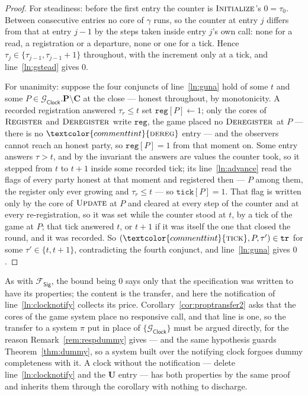\documentclass[10pt,oneside,openany]{book}
\newcommand{\Ps}{\mathbf{P}}
\newcommand{\uses}{\mathbf{U}}
\newcommand{\Cs}{\mathbf{C}}
\newcommand{\op}[1]{\textnormal{\textsc{#1}}}
\newcommand{\atom}[1]{\textcolor{commenttint}{\op{#1}}}
\newcommand{\Fsig}{\mathcal{F}_{\mathsf{Sig}}}
\newcommand{\Gclock}{\mathcal{G}_{\mathsf{Clock}}}
\newcommand{\V}[1]{\mathtt{#1}}
\theoremstyle{accentdef}
\theoremstyle{accentplain}
\begin{document}
\begin{proof}
For steadiness: before the first entry the counter is $\op{Initialize}$'s $0 = \tau_0$. Between
consecutive entries no core of $\gamma$ runs, so the counter at entry $j$ differs from that at
entry $j-1$ by the steps taken inside entry $j$'s own call: none for a read, a registration or a
departure, none or one for a tick. Hence $\tau_j \in \{\tau_{j-1}, \tau_{j-1}+1\}$ throughout,
with the increment only at a tick, and line~\ref{ln:gstead} gives $0$.

For unanimity: suppose the four conjuncts of line~\ref{ln:guna} hold of some $t$ and some
$P \in \Gclock.\Ps \setminus \Cs$ at the close --- honest throughout, by monotonicity. A recorded
registration answered $\tau_r \leq t$ set $\V{reg}[P] \gets 1$; only the cores of $\op{Register}$
and $\op{Deregister}$ write $\V{reg}$, the game placed no $\op{Deregister}$ at $P$ --- there is
no $\atom{dereg}$ entry --- and the observers cannot reach an honest party, so $\V{reg}[P] = 1$
from that moment on. Some entry answers $\tau > t$, and by the invariant the answers are values
the counter took, so it stepped from $t$ to $t+1$ inside some recorded tick; its
line~\ref{ln:advance} read the flags of every party honest at that moment and registered then ---
$P$ among them, the register only ever growing and $\tau_r \leq t$ --- so $\V{tick}[P] = 1$. That
flag is written only by the core of $\op{Update}$ at $P$ and cleared at every step of the counter
and at every re-registration, so it was set while the counter stood at $t$, by a tick of the game
at $P$; that tick answered $t$, or $t+1$ if it was itself the one that closed the round, and it
was recorded. So $(\atom{tick},P,\tau') \in \V{tr}$ for some $\tau' \in \{t,t+1\}$, contradicting
the fourth conjunct, and line~\ref{ln:guna} gives $0$.
\end{proof}

As with $\Fsig$, the bound being $0$ says only that the specification was written to have its
properties; the content is the transfer, and here the notification of line~\ref{ln:clocknotify}
collects its price. Corollary~\ref{cor:proptransfer2} asks that the cores of the game system
place no responsive call, and that line is one, so the transfer to a system $\pi$ put in place of
$\{\Gclock\}$ must be argued directly, for the reason Remark~\ref{rem:respdummy} gives --- and
the same hypothesis guards Theorem~\ref{thm:dummy}, so a system built over the notifying clock
forgoes dummy completeness with it. A clock without the notification --- delete
line~\ref{ln:clocknotify} and the $\uses$ entry --- has both properties by the same proof and
inherits them through the corollary with nothing to discharge.
\end{document}
